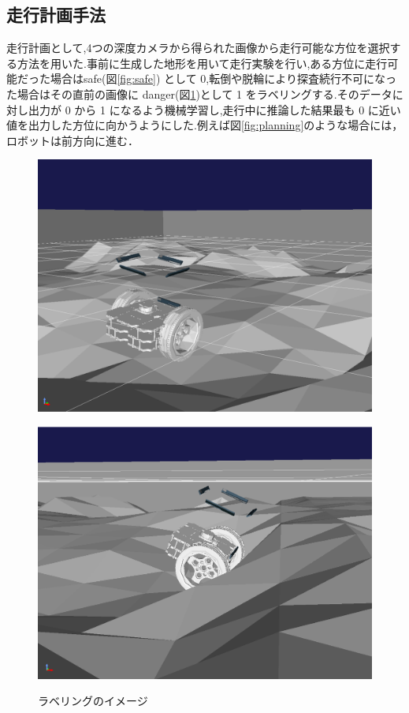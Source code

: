 \subsection{走行計画手法}
走行計画として,4つの深度カメラから得られた画像から走行可能な方位を選択する方法を用いた.事前に生成した地形を用いて走行実験を行い,ある方位に走行可能だった場合はsafe(図\ref{fig:safe}) として 0,転倒や脱輪により探査続行不可になった場合はその直前の画像に danger(図\ref{fig:stack})として 1 をラベリングする.そのデータに対し出力が 0 から 1 になるよう機械学習し,走行中に推論した結果最も 0 に近い値を出力した方位に向かうようにした.例えば図\ref{fig:planning}のような場合には，ロボットは前方向に進む．
 \begin{figure}[htbp]
  \centering
  \begin{minipage}[b]{0.47\linewidth}
    \centering
    \includegraphics[keepaspectratio, scale=0.17]{images/safe.png}
    \label{fig:safe}
  \end{minipage}
  \begin{minipage}[b]{0.47\linewidth}
    \centering
    \includegraphics[keepaspectratio, scale=0.16]{images/stack.png}
    \label{fig:stack}
  \end{minipage}
  \caption{ラベリングのイメージ}
\end{figure}

